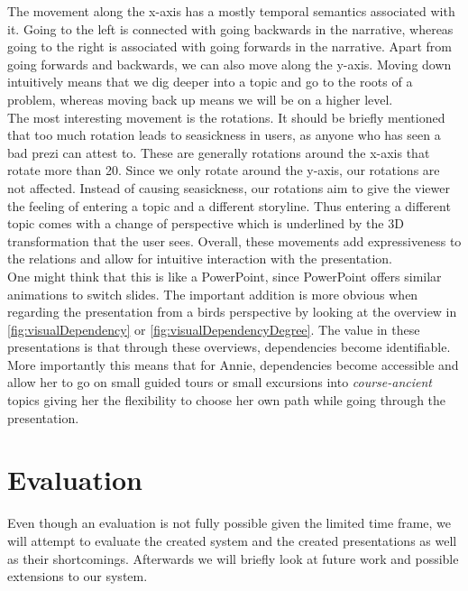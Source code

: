 \documentclass[twoside, 12pt]{article}
\begin{document}
The movement along the x-axis has a mostly temporal semantics associated with it. Going to the left is connected with going backwards in the narrative, whereas going to the right is associated with going forwards in the narrative. Apart from going forwards and backwards, we can also move along the y-axis. Moving down intuitively means that we dig deeper into a topic and go to the roots of a problem, whereas moving back up means we will be on a higher level.\\

The most interesting movement is the rotations. It should be briefly mentioned that too much rotation leads to seasickness in users, as anyone who has seen a bad prezi can attest to. These are generally rotations around the x-axis that rotate more than 20\degree. Since we only rotate around the y-axis, our rotations are not affected. Instead of causing seasickness, our rotations aim to give the viewer the feeling of entering a topic and a different storyline. Thus entering a different topic comes with a change of perspective which is underlined by the 3D transformation that the user sees. Overall, these movements add expressiveness to the relations and allow for intuitive interaction with the presentation.\\

One might think that this is like a PowerPoint, since PowerPoint offers similar animations to switch slides. The important addition is more obvious when regarding the presentation from a birds perspective by looking at the overview in \autoref{fig:visualDependency} or \autoref{fig:visualDependencyDegree}. The value in these presentations is that through these overviews, dependencies become identifiable. More importantly this means that for Annie, dependencies become accessible and allow her to go on small guided tours or small excursions into \textit{course-ancient} topics giving her the flexibility to choose her own path while going through the presentation.

\section{Evaluation}
\label{sec:eval}

Even though an evaluation is not fully possible given the limited time frame, we will attempt to evaluate the created system and the created presentations as well as their shortcomings. Afterwards we will briefly look at future work and possible extensions to our system.\\
\end{document}

